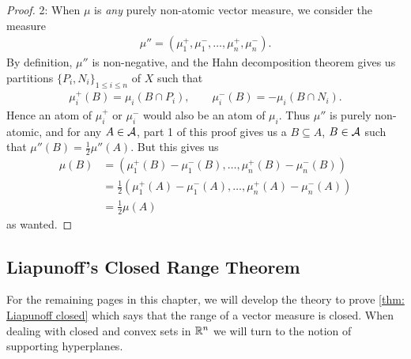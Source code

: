 \documentclass[../../main.tex]{subfiles}
\begin{document}
\begin{proof}
2: When $\mu$ is \emph{any} purely non-atomic vector measure, we consider the measure
\begin{align*}
	\mu''=(\mu_{1}^{+}, \mu_{1}^{-}, \dots, \mu_{n}^{+}, \mu_{n}^{-}).
\end{align*}
By definition, $\mu''$ is non-negative, and the Hahn decomposition theorem gives us partitions $\{P_{i}, N_{i}\}_{1\le i \le n}$ of $X$ such that
\begin{align*}
	\mu_{i}^{+}(B)=\mu_{i}(B\cap P_{i}), \qquad \mu_{i}^{-}(B)=-\mu_{i}(B\cap N_{i}).
\end{align*}
Hence an atom of $\mu_{i}^{+}$ or $\mu_{i}^{-}$ would also be an atom of $\mu_{i}$. Thus $\mu''$ is purely non-atomic, and for any $A\in \mathcal{A}$, part 1 of this proof gives us a $B\subseteq A$, $B\in \mathcal{A}$ such that $\mu''(B)=\frac{1}{2}\mu''(A)$. But this gives us
\begin{align*}
	\mu(B)&=(\mu_{1}^{+}(B) - \mu_{1}^{-}(B), \dots, \mu_{n}^{+}(B) - \mu_{n}^{-}(B)) \\
	&=\frac{1}{2}(\mu_{1}^{+}(A) - \mu_{1}^{-}(A), \dots, \mu_{n}^{+}(A) - \mu_{n}^{-}(A)) \\
	&=\frac{1}{2}\mu(A)
\end{align*}
as wanted.
\end{proof}


\subsection{Liapunoff's Closed Range Theorem}

For the remaining pages in this chapter, we will develop the theory to prove \cref{thm: Liapunoff closed} which says that the range of a vector measure is closed. When dealing with closed and convex sets in $\mathbb{R}^{n}$ we will turn to the notion of supporting hyperplanes.
\end{document}
